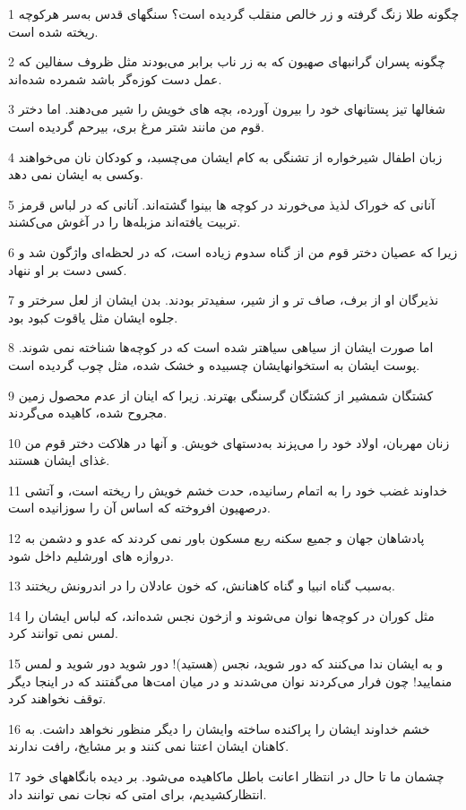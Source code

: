 \par 1 چگونه طلا زنگ گرفته و زر خالص منقلب گردیده است؟ سنگهای قدس به‌سر هرکوچه ریخته شده است.
\par 2 چگونه پسران گرانبهای صهیون که به زر ناب برابر می‌بودند مثل ظروف سفالین که عمل دست کوزه‌گر باشد شمرده شده‌اند.
\par 3 شغالها تیز پستانهای خود را بیرون آورده، بچه های خویش را شیر می‌دهند. اما دختر قوم من مانند شتر مرغ بری، بیرحم گردیده است.
\par 4 زبان اطفال شیرخواره از تشنگی به کام ایشان می‌چسبد، و کودکان نان می‌خواهند وکسی به ایشان نمی دهد.
\par 5 آنانی که خوراک لذیذ می‌خورند در کوچه ها بینوا گشته‌اند. آنانی که در لباس قرمز تربیت یافته‌اند مزبله‌ها را در آغوش می‌کشند.
\par 6 زیرا که عصیان دختر قوم من از گناه سدوم زیاده است، که در لحظه‌ای واژگون شد و کسی دست بر او ننهاد.
\par 7 نذیرگان او از برف، صاف تر و از شیر، سفیدتر بودند. بدن ایشان از لعل سرختر و جلوه ایشان مثل یاقوت کبود بود.
\par 8 اما صورت ایشان از سیاهی سیاهتر شده است که در کوچه‌ها شناخته نمی شوند. پوست ایشان به استخوانهایشان چسبیده و خشک شده، مثل چوب گردیده است.
\par 9 کشتگان شمشیر از کشتگان گرسنگی بهترند. زیرا که اینان از عدم محصول زمین مجروح شده، کاهیده می‌گردند.
\par 10 زنان مهربان، اولاد خود را می‌پزند به‌دستهای خویش. و آنها در هلاکت دختر قوم من غذای ایشان هستند.
\par 11 خداوند غضب خود را به اتمام رسانیده، حدت خشم خویش را ریخته است، و آتشی درصهیون افروخته که اساس آن را سوزانیده است.
\par 12 پادشاهان جهان و جمیع سکنه ربع مسکون باور نمی کردند که عدو و دشمن به دروازه های اورشلیم داخل شود.
\par 13 به‌سبب گناه انبیا و گناه کاهنانش، که خون عادلان را در اندرونش ریختند.
\par 14 مثل کوران در کوچه‌ها نوان می‌شوند و ازخون نجس شده‌اند، که لباس ایشان را لمس نمی توانند کرد.
\par 15 و به ایشان ندا می‌کنند که دور شوید، نجس (هستید)! دور شوید دور شوید و لمس منمایید! چون فرار می‌کردند نوان می‌شدند و در میان امت‌ها می‌گفتند که در اینجا دیگر توقف نخواهند کرد.
\par 16 خشم خداوند ایشان را پراکنده ساخته وایشان را دیگر منظور نخواهد داشت. به کاهنان ایشان اعتنا نمی کنند و بر مشایخ، رافت ندارند.
\par 17 چشمان ما تا حال در انتظار اعانت باطل ماکاهیده می‌شود. بر دیده بانگاههای خود انتظارکشیدیم، برای امتی که نجات نمی توانند داد.

